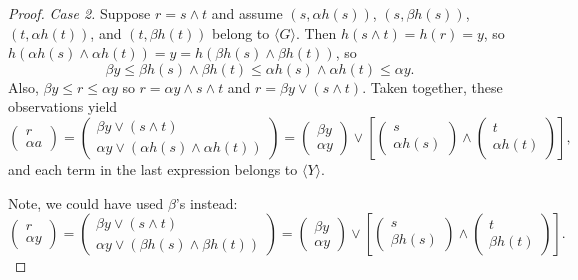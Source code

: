 \begin{proof}
{\it Case 2.} Suppose $r = s \wedge t$ and assume 
$(s, \alpha {h(s)})$, $(s, \beta{h(s)})$, $(t, \alpha {h(t)})$, and $(t, \beta{h(t)})$ belong to $\langle G \rangle$. Then $h(s\wedge t) = h(r) = y$, so 
$h(\alpha {h(s)} \wedge\alpha {h(t)}) = y = h(\beta {h(s)} \wedge\beta {h(t)})$, so
\[
\beta y \leqslant \beta h(s) \wedge \beta h(t) \leqslant \alpha {h(s)} \wedge \alpha {h(t)} \leqslant \alpha y.
\]
Also, $\beta y \leqslant r \leqslant \alpha y$ so $r = \alpha y \wedge s\wedge t$
and $r = \beta y \vee (s\wedge t)$. Taken together, these 
observations yield
\[
\left(\begin{array}{c} r \\ \alpha a\end{array}\right) = 
\left(\begin{array}{c} \beta y \vee (s\wedge t) \\ \alpha y \vee (\alpha {h(s)} \wedge \alpha {h(t)}) \end{array}\right) = 
\left(\begin{array}{c} \beta y\\ \alpha y\end{array}\right) \vee
\left[\left(\begin{array}{c}s \\ \alpha {h(s)}\end{array}\right) \wedge \left(\begin{array}{c}t \\ \alpha {h(t)} \end{array}\right)\right],\]
and each term in the last expression belongs to $\langle Y \rangle$.

Note, we could have used $\beta$'s instead:
\[\left(\begin{array}{c} r \\ \alpha y\end{array}\right) = 
\left(\begin{array}{c} \beta y \vee (s\wedge t) \\ \alpha y \vee (\beta {h(s)} \wedge \beta {h(t)}) \end{array}\right) = 
\left(\begin{array}{c} \beta y\\ \alpha y\end{array}\right) \vee
\left[\left(\begin{array}{c}s \\ \beta {h(s)}\end{array}\right) \wedge \left(\begin{array}{c}t \\ \beta {h(t)} \end{array}\right)\right].\]


\end{proof}
